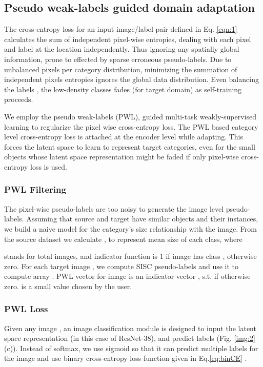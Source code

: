 \documentclass[10pt,twocolumn,letterpaper]{article}
\begin{document}
\subsection{Pseudo weak-labels guided domain adaptation}
\label{sec:pwl}

The cross-entropy loss for an input image/label pair defined in Eq. \ref{eqn:1} calculates the sum of independent pixel-wise entropies, dealing with each pixel and label at the location independently. 
Thus ignoring any spatially global information, prone to effected by sparse erroneous pseudo-labels. 
Due to unbalanced pixels per category distribution, minimizing the summation of independent pixels entropies ignores the global data distribution. Even balancing the labels \cite{zou2018unsupervised}, the low-density classes fades (for target domain) as self-training proceeds. 

We employ the pseudo weak-labels (PWL), guided multi-task weakly-supervised learning to regularize the pixel wise cross-entropy loss. 
The PWL based category level cross-entropy loss is attached at the encoder level while adapting. This forces the latent space to learn to represent target categories, even for the small objects whose latent space representation might be faded if only pixel-wise cross-entropy loss is used. 


\subsubsection{PWL Filtering}
\label{sec:pwlFiltering}
The pixel-wise pseudo-labels are too noisy to generate the image level pseudo-labels. 
Assuming that source and target have similar objects and their instances, we build a naive model for the category's size relationship with the image. 
From the source dataset we calculate , to represent mean size of each class, where

 stands for total images, and indicator function  is 1 if  image has class , otherwise zero.
For each target image , we compute SISC pseudo-labels  and use it to compute array . PWL vector for image  is an indicator vector , s.t.  if  otherwise zero.    is a small value chosen by the user.

\subsubsection{PWL Loss}
Given any image , an image classification module  is designed to input the latent space representation (in this case of ResNet-38), and predict labels (Fig. \ref{img:2}(c)). Instead of softmax, we use sigmoid so that it can predict multiple labels for the image and use binary cross-entropy loss function given in Eq.\ref{eq:binCE} .
\end{document}
